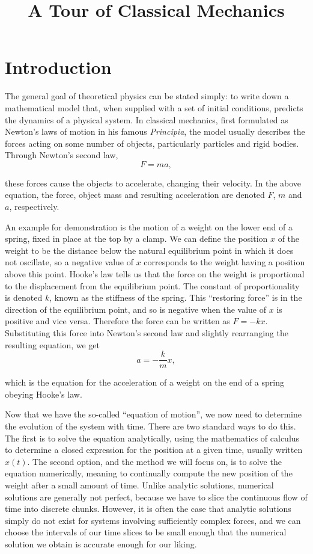 \documentclass[11pt]{article}
\title{A Tour of Classical Mechanics}
\author{}
\date{}
\begin{document}
\maketitle
\vspace{-4em}

\section{Introduction}

The general goal of theoretical physics can be stated simply: to write down a mathematical model that, when supplied with a set of initial conditions, predicts the dynamics of a physical system. In classical mechanics, first formulated as Newton's laws of motion in his famous \textit{Principia}, the model usually describes the forces acting on some number of objects, particularly particles and rigid bodies. Through Newton's second law,
$$F=ma,$$

these forces cause the objects to accelerate, changing their velocity. In the above equation, the force, object mass and resulting acceleration are denoted $F$, $m$ and $a$, respectively.
\newline

An example for demonstration is the motion of a weight on the lower end of a spring, fixed in place at the top by a clamp. We can define the position $x$ of the weight to be the distance below the natural equilibrium point in which it does not oscillate, so a negative value of $x$ corresponds to the weight having a position above this point. Hooke's law tells us that the force on the weight is proportional to the displacement from the equilibrium point. The constant of proportionality is denoted $k$, known as the stiffness of the spring. This ``restoring force'' is in the direction of the equilibrium point, and so is negative when the value of $x$ is positive and vice versa. Therefore the force can be written as $F=-kx$. Substituting this force into Newton's second law and slightly rearranging the resulting equation, we get
$$a=-\frac{k}{m}x,$$

which is the equation for the acceleration of a weight on the end of a spring obeying Hooke's law.
\newpage

Now that we have the so\hyp{}called ``equation of motion'', we now need to determine the evolution of the system with time. There are two standard ways to do this. The first is to solve the equation analytically, using the mathematics of calculus to determine a closed expression for the position at a given time, usually written $x(t)$. The second option, and the method we will focus on, is to solve the equation numerically, meaning to continually compute the new position of the weight after a small amount of time. Unlike analytic solutions, numerical solutions are generally not perfect, because we have to slice the continuous flow of time into discrete chunks. However, it is often the case that analytic solutions simply do not exist for systems involving sufficiently complex forces, and we can choose the intervals of our time slices to be small enough that the numerical solution we obtain is accurate enough for our liking.
\newline
\end{document}
